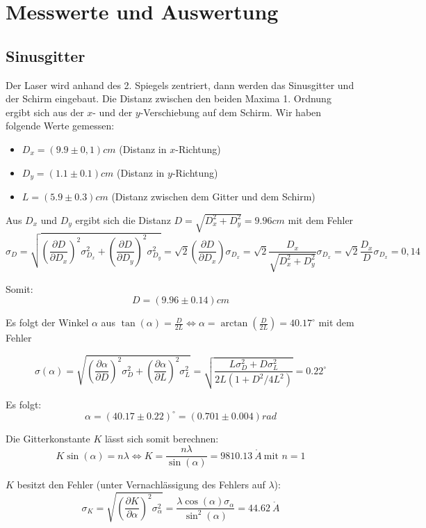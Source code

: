 \section{Messwerte und Auswertung}

\subsection{Sinusgitter} %

Der Laser wird anhand des 2. Spiegels zentriert, dann werden das Sinusgitter und der Schirm eingebaut. Die Distanz zwischen den beiden Maxima 1. Ordnung ergibt sich aus der $x$- und der $y$-Verschiebung auf dem Schirm. Wir haben folgende Werte gemessen:
\begin{itemize}
\item $D_x = (9.9 \pm 0,1) cm$ (Distanz in $x$-Richtung)
\item $D_y = (1.1 \pm 0.1) cm$ (Distanz in $y$-Richtung)
\item $L = (5.9 \pm 0.3) cm$ (Distanz zwischen dem Gitter und dem Schirm)
\end{itemize}

Aus $D_x$ und $D_y$ ergibt sich die Distanz $D=\sqrt{D_x^2 + D_y^2} = 9.96 cm$ mit dem Fehler
$$\sigma_D = \sqrt{\left(\frac{\partial D}{\partial D_x}\right)^2\sigma_{D_x}^2 + \left(\frac{\partial D}{\partial D_y}\right)^2\sigma_{D_y}^2} = \sqrt 2 \left(\frac{\partial D}{\partial D_x}\right)\sigma_{D_x} = \sqrt 2 \frac{D_x}{\sqrt{D_x^2 + D_y^2}}\sigma_{D_x} = \sqrt 2 \frac{D_x}{D}\sigma_{D_x} = 0,14$$

Somit: $$\boxed{D = (9.96 \pm 0.14) cm}$$

Es folgt der Winkel $\alpha$ aus $\tan(\alpha) = \frac{D}{2L} \Leftrightarrow\alpha = \arctan\left(\frac{D}{2L}\right) = 40.17^\circ$ mit dem Fehler

$$\sigma(\alpha) = \sqrt{\left(\frac{\partial \alpha}{\partial D}\right)^2\sigma_{D}^2 + \left(\frac{\partial \alpha}{\partial L}\right)^2\sigma_{L}^2} = \sqrt{\frac{L\sigma_D^2 + D\sigma_L^2}{2L(1+D^2/4L^2)}} = 0.22^\circ$$

Es folgt: $$\boxed{\alpha = (40.17 \pm 0.22)^\circ = (0.701 \pm 0.004) rad} $$

Die Gitterkonstante $K$ l\"asst sich somit berechnen: $$ K\sin(\alpha) = n\lambda \Leftrightarrow K = \frac{n\lambda}{\sin(\alpha)} = 9810.13 \ \mathring A \ \text{mit \ } n=1$$

$K$ besitzt den Fehler (unter Vernachl\"assigung des Fehlers auf $\lambda$): $$\sigma_K = \sqrt{\left(\frac{\partial K}{\partial \alpha}\right)^2\sigma_\alpha^2} = \frac{\lambda\cos(\alpha)\sigma_\alpha}{\sin^2(\alpha)} = 44.62 \ \mathring A$$

